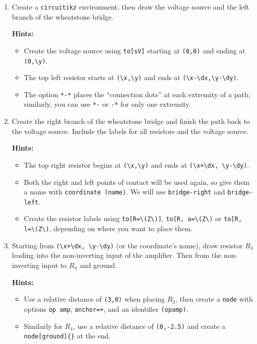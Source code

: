 \begin{enumerate}
\begin{enumerate}
        \item Create a \texttt{circuitikz} environment, then draw the voltage source and the left branch of the wheatstone bridge.
        
        \textbf{Hints:} \begin{itemize}
            \item Create the voltage source using \verb|to[sV]| starting at \verb|(0,0)| and ending at \verb|(0,\y)|.
            \item The top left resistor starts at \verb|(\x,\y)| and ends at \verb|(\x-\dx,\y-\dy)|.
            \item The option \verb|*-*| places the ``connection dots'' at each extremity of a path; similarly, you can use \verb|*-| or \verb|-*| for only one extremity.
        \end{itemize}
            
        \item Create the right branch of the wheatstone bridge and finish the path back to the voltage source. Include the labels for all resistors and the voltage source.
        
        \textbf{Hints:}
        \begin{itemize}
            \item The top right resistor begins at \verb|(\x,\y)| and ends at \verb|(\x+\dx, \y-\dy)|.
            \item Both the right and left points of contact will be used again, so give them a name with \texttt{coordinate (name)}. We will use \texttt{bridge-right} and \texttt{bridge-left}.
            \item Create the resistor labels using \verb|to[R=\(Z\)]|, \verb|to[R, a=\(Z\)| or \verb|to[R, l=\(Z\)|, depending on where you want to place them.
        \end{itemize}

        \item Starting from \verb|(\x+\dx, \y-\dy)| (or the coordinate's name), draw resistor \( R_3 \) leading into the non-inverting input of the amplifier. Then from the non-inverting input to \( R_4 \) and ground.
        
        \textbf{Hints:} \begin{itemize}
            \item Use a relative distance of \verb|(3,0)| when placing \( R_3 \), then create a \texttt{node} with options \verb|op amp|, \verb|anchor=+|, and an identifier \verb|(opamp)|.
            \item Similarly for \( R_4 \), use a relative distance of \verb|(0,-2.5)| and create a \verb|node[ground]{}| at the end.
        \end{itemize}


\end{enumerate}
\end{enumerate}
